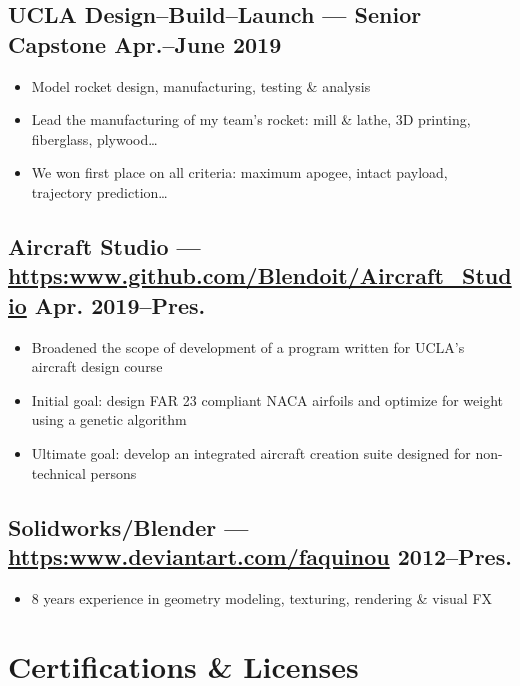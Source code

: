 \documentclass[10pt]{article}
\begin{document}
\subsection*{UCLA Design--Build--Launch --- Senior Capstone \hfill Apr.--June 2019}
\label{sec:orgc2aeb5e}

\begin{itemize}
\item Model rocket design, manufacturing, testing \& analysis
\item Lead the manufacturing of my team's rocket: mill \& lathe, 3D printing, fiberglass, plywood\ldots{}
\item We won first place on all criteria: maximum apogee, intact payload, trajectory prediction\ldots{}
\end{itemize}

\subsection*{Aircraft Studio --- \url{https:www.github.com/Blendoit/Aircraft\_Studio} \hfill Apr. 2019--Pres.}
\label{sec:org312ac4d}

\begin{itemize}
\item Broadened the scope of development of a program written for UCLA's aircraft design course
\item Initial goal: design FAR 23 compliant NACA airfoils and optimize for weight using a genetic algorithm
\item Ultimate goal: develop an integrated aircraft creation suite designed for non-technical persons
\end{itemize}

\subsection*{Solidworks/Blender --- \url{https:www.deviantart.com/faquinou} \hfill 2012--Pres.}
\label{sec:org46435c6}

\begin{itemize}
\item 8 years experience in geometry modeling, texturing, rendering \& visual FX
\end{itemize}

\section*{Certifications \& Licenses}
\label{sec:org70172c3}
\end{document}
